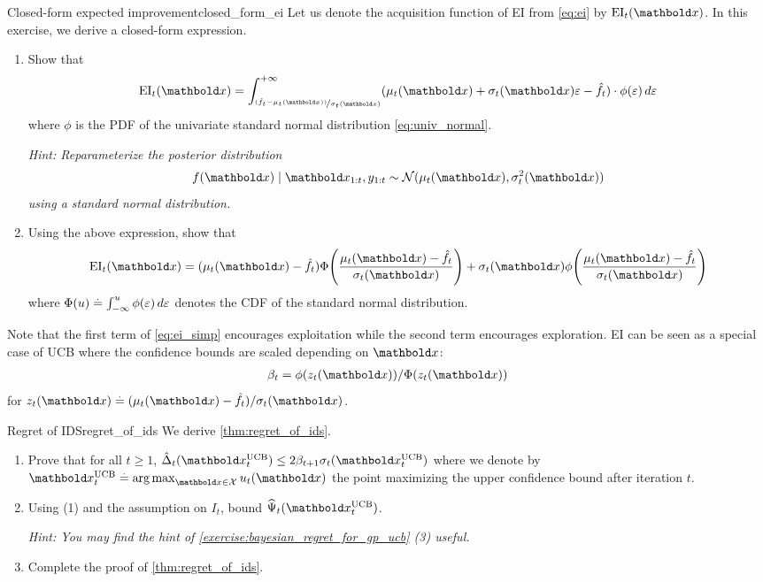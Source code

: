 \begin{nexercise}{Closed-form expected improvement}{closed_form_ei}
  Let us denote the acquisition function of EI from \cref{eq:ei} by $\mathrm{EI}_t(\vx)$.
  In this exercise, we derive a closed-form expression.

  \begin{enumerate}
    \item Show that \begin{align}
      \mathrm{EI}_t(\vx) = \int_{\nicefrac{(\hat{f}_t - \mu_{t}(\vx))}{\sigma_{t}(\vx)}}^{+\infty} (\mu_{t}(\vx) + \sigma_{t}(\vx) \varepsilon - \hat{f}_t) \cdot \phi(\varepsilon) \,d\varepsilon
    \end{align} where $\phi$ is the PDF of the univariate standard normal distribution \eqref{eq:univ_normal}.\par
    \textit{Hint: Reparameterize the posterior distribution \begin{align*}
      f(\vx) \mid \vx_{1:t}, y_{1:t} \sim \N{\mu_{t}(\vx)}{\sigma_{t}^2(\vx)}
    \end{align*} using a standard normal distribution.}
    \item Using the above expression, show that \begin{align}
      \mathrm{EI}_t(\vx) = (\mu_{t}(\vx) - \hat{f}_t) \Phi\parentheses*{\frac{\mu_{t}(\vx) - \hat{f}_t}{\sigma_{t}(\vx)}} + \sigma_{t}(\vx) \phi\parentheses*{\frac{\mu_{t}(\vx) - \hat{f}_t}{\sigma_{t}(\vx)}} \label{eq:ei_simp}
    \end{align} where $\Phi(u) \overset{.}{=} \int_{-\infty}^u \phi(\varepsilon) \,d\varepsilon$ denotes the CDF of the standard normal distribution.
  \end{enumerate}
  Note that the first term of \cref{eq:ei_simp} encourages exploitation while the second term encourages exploration.
  EI can be seen as a special case of UCB where the confidence bounds are scaled depending on $\vx$: \begin{align*}
    \beta_t = \phi(z_t(\vx)) / \Phi(z_t(\vx))
  \end{align*} for $z_t(\vx) \defeq (\mu_{t}(\vx) - \hat{f}_t) / \sigma_{t}(\vx)$.
\end{nexercise}

\begin{nexercise}{Regret of IDS}{regret_of_ids}
  We derive \cref{thm:regret_of_ids}.
  \begin{enumerate}
    \item Prove that for all $t \geq 1$, $\hat{\Delta}_t(\vx_t^{\mathrm{UCB}}) \leq 2 \beta_{t+1} \sigma_t(\vx_t^{\mathrm{UCB}})$ where we denote by $\vx_t^{\mathrm{UCB}} \defeq \argmax_{\vx \in \spX} u_t(\vx)$ the point maximizing the upper confidence bound after iteration $t$.
    \item Using (1) and the assumption on $I_t$, bound $\widehat{\Psi}_t(\vx_t^{\mathrm{UCB}})$.\par
    \textit{Hint: You may find the hint of \cref{exercise:bayesian_regret_for_gp_ucb} (3) useful.}
    \item Complete the proof of \cref{thm:regret_of_ids}.
  \end{enumerate}
\end{nexercise}

